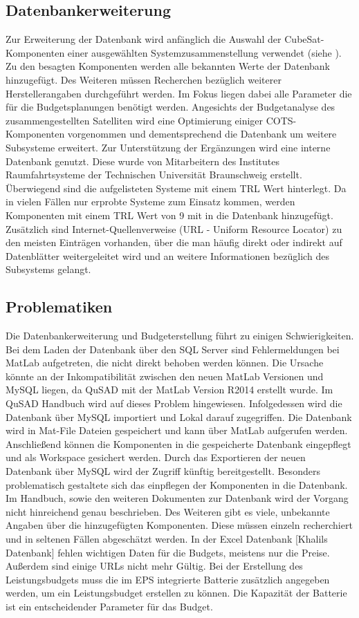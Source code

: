 			\subsection{Datenbankerweiterung}
			
			Zur Erweiterung der Datenbank wird anfänglich die Auswahl der CubeSat-Komponenten einer ausgewählten Systemzusammenstellung verwendet (siehe ). Zu den besagten Komponenten werden alle bekannten Werte der Datenbank hinzugefügt. Des Weiteren müssen Recherchen bezüglich weiterer Herstellerangaben durchgeführt werden. Im Fokus liegen dabei alle Parameter die für die Budgetsplanungen benötigt werden. Angesichts der Budgetanalyse des zusammengestellten Satelliten wird eine Optimierung einiger COTS-Komponenten vorgenommen und dementsprechend die Datenbank um weitere Subsysteme erweitert. Zur Unterstützung der Ergänzungen wird eine interne Datenbank genutzt. Diese wurde von Mitarbeitern des Institutes Raumfahrtsysteme der Technischen Universität Braunschweig erstellt. Überwiegend sind die aufgelisteten Systeme mit einem TRL Wert hinterlegt. Da in vielen Fällen nur erprobte Systeme zum Einsatz kommen, werden Komponenten mit einem TRL Wert von 9 mit in die Datenbank hinzugefügt. Zusätzlich sind Internet-Quellenverweise (URL - Uniform Resource Locator) zu den meisten Einträgen vorhanden, über die man häufig direkt oder indirekt auf Datenblätter weitergeleitet wird und an weitere Informationen bezüglich des Subsystems gelangt.
			\subsection{Problematiken}
			Die Datenbankerweiterung und Budgeterstellung führt zu einigen Schwierigkeiten. Bei dem Laden der Datenbank über den SQL Server sind Fehlermeldungen bei MatLab aufgetreten, die nicht direkt behoben werden können. Die Ursache könnte an der Inkompatibilität zwischen den neuen MatLab Versionen und MySQL liegen, da QuSAD mit der MatLab Version R2014 erstellt wurde. Im QuSAD Handbuch wird auf dieses Problem hingewiesen. Infolgedessen wird die Datenbank über MySQL importiert und Lokal darauf zugegriffen. Die Datenbank wird in Mat-File Dateien gespeichert und kann über MatLab aufgerufen werden. Anschließend können die Komponenten in die gespeicherte Datenbank eingepflegt und als Workspace gesichert werden. Durch das Exportieren der neuen Datenbank über MySQL wird der Zugriff künftig bereitgestellt. Besonders problematisch gestaltete sich das einpflegen der Komponenten in die Datenbank. Im Handbuch, sowie den weiteren Dokumenten zur Datenbank wird der Vorgang nicht hinreichend genau beschrieben. Des Weiteren gibt es viele, unbekannte Angaben über die hinzugefügten Komponenten. Diese müssen einzeln recherchiert und in seltenen Fällen abgeschätzt werden. In der Excel Datenbank [Khalils Datenbank] fehlen wichtigen Daten für die Budgets, meistens nur die Preise. Außerdem sind einige URLs nicht mehr Gültig. Bei der Erstellung des Leistungsbudgets muss die im EPS integrierte Batterie zusätzlich angegeben werden, um ein Leistungsbudget erstellen zu können. Die Kapazität der Batterie ist ein entscheidender Parameter für das Budget.
		
